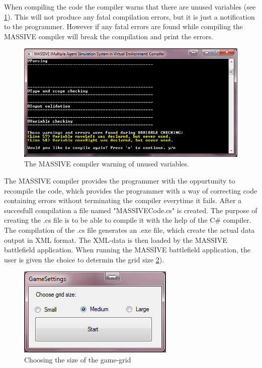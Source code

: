 When compiling the code the compiler warns that there are unused variables (see \ref{fig:compiler}). This will not produce any fatal compilation errors, but it is just a notification to the programmer. However if any fatal errors are found while compiling the MASSIVE compiler will break the compilation and print the errors.


\begin{figure}[h]%
\begin{center}
\includegraphics[scale=0.6]{Images/compiler.png}%
\end{center}
\caption{The MASSIVE compiler warning of unused variables.}%
\label{fig:compiler}%
\end{figure}

The MASSIVE compiler provides the programmer with the oppurtunity to recompile the code, which provides the programmer with a way of correcting code containing errors without terminating the compiler everytime it fails. After a succesfull compilation a file named "MASSIVECode.cs" is created. The purpose of creating the .cs file is to be able to compile it with the help of the C\# compiler. The compilation of the .cs file generates an .exe file, which create the actual data output in XML format. The XML-data is then loaded by the MASSIVE battlefield application. When running the MASSIVE battlefield application, the user is given the choice to determin the grid size \ref{fig:game_promt}).

\begin{figure}[h]%
\begin{center}
\includegraphics[scale=0.6]{Images/massive_dialog.png}%
\end{center}
\caption{Choosing the size of the game-grid}%
\label{fig:game_promt}%
\end{figure}

